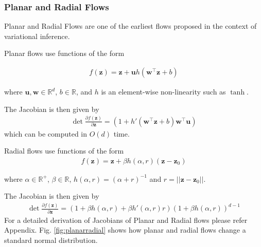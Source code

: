 \documentclass[runningheads]{llncs}
\begin{document}
\subsubsection{Planar and Radial Flows} 
Planar and Radial Flows \cite{rezende2015variational} are one of the earliest flows proposed in the context of variational inference. 

Planar flows use functions of the form

\begin{align}
f(\mathbf{z}) = \mathbf{z} + \mathbf{u}h(\mathbf{w}^\top\mathbf{z} + b)
\label{eq:planarfn}
\end{align}

where $\mathbf{u},\mathbf{w}\in \mathbb{R}^d$, $b \in \mathbb{R}$, and $h$ is an element-wise non-linearity such as $\tanh$.

The Jacobian is then given by
\begin{align}
\det\frac{\partial f(\mathbf{z})}{\partial \mathbf{z}} =(1 + h'(\mathbf{w}^\top\mathbf{z} + b)\mathbf{w}^\top\mathbf{u})
\end{align}
which can be computed in $O(d)$ time.

Radial flows use functions of the form
\begin{align}
f(\mathbf{z}) = \mathbf{z} + \beta h(\alpha,r)(\mathbf{z}-\mathbf{z}_0)
\label{eq:radialfn}
\end{align}

where $\alpha \in \mathbb{R}^+$, $\beta \in \mathbb{R}$, $h(\alpha,r) = (\alpha + r)^{-1}$ and $r = \vert\vert\mathbf{z} - \mathbf{z}_0\vert\vert$.

The Jacobian is then given by
\begin{align}
\det\frac{\partial f(\mathbf{z})}{\partial \mathbf{z}} = \left(1 + \beta h(\alpha,r) + \beta h'(\alpha,r)r\right)(1+\beta h(\alpha,r))^{d-1}
\end{align}
For a detailed derivation of Jacobians of Planar and Radial flows please refer Appendix. Fig. \ref{fig:planarradial} shows how planar and radial flows change a standard normal distribution.
\end{document}
